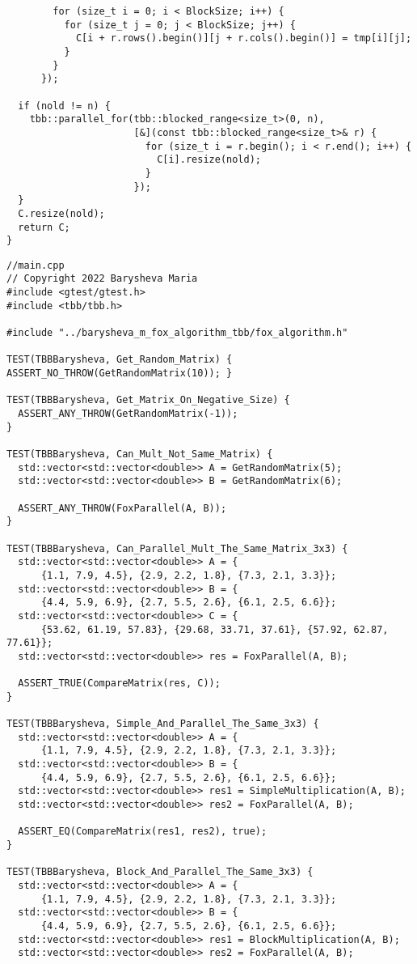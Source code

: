 \documentclass[12pt]{article}
\begin{document}
\begin{lstlisting}
        for (size_t i = 0; i < BlockSize; i++) {
          for (size_t j = 0; j < BlockSize; j++) {
            C[i + r.rows().begin()][j + r.cols().begin()] = tmp[i][j];
          }
        }
      });

  if (nold != n) {
    tbb::parallel_for(tbb::blocked_range<size_t>(0, n),
                      [&](const tbb::blocked_range<size_t>& r) {
                        for (size_t i = r.begin(); i < r.end(); i++) {
                          C[i].resize(nold);
                        }
                      });
  }
  C.resize(nold);
  return C;
}
\end{lstlisting}
\begin{lstlisting}
//main.cpp
// Copyright 2022 Barysheva Maria
#include <gtest/gtest.h>
#include <tbb/tbb.h>

#include "../barysheva_m_fox_algorithm_tbb/fox_algorithm.h"

TEST(TBBBarysheva, Get_Random_Matrix) { ASSERT_NO_THROW(GetRandomMatrix(10)); }

TEST(TBBBarysheva, Get_Matrix_On_Negative_Size) {
  ASSERT_ANY_THROW(GetRandomMatrix(-1));
}

TEST(TBBBarysheva, Can_Mult_Not_Same_Matrix) {
  std::vector<std::vector<double>> A = GetRandomMatrix(5);
  std::vector<std::vector<double>> B = GetRandomMatrix(6);

  ASSERT_ANY_THROW(FoxParallel(A, B));
}

TEST(TBBBarysheva, Can_Parallel_Mult_The_Same_Matrix_3x3) {
  std::vector<std::vector<double>> A = {
      {1.1, 7.9, 4.5}, {2.9, 2.2, 1.8}, {7.3, 2.1, 3.3}};
  std::vector<std::vector<double>> B = {
      {4.4, 5.9, 6.9}, {2.7, 5.5, 2.6}, {6.1, 2.5, 6.6}};
  std::vector<std::vector<double>> C = {
      {53.62, 61.19, 57.83}, {29.68, 33.71, 37.61}, {57.92, 62.87, 77.61}};
  std::vector<std::vector<double>> res = FoxParallel(A, B);

  ASSERT_TRUE(CompareMatrix(res, C));
}

TEST(TBBBarysheva, Simple_And_Parallel_The_Same_3x3) {
  std::vector<std::vector<double>> A = {
      {1.1, 7.9, 4.5}, {2.9, 2.2, 1.8}, {7.3, 2.1, 3.3}};
  std::vector<std::vector<double>> B = {
      {4.4, 5.9, 6.9}, {2.7, 5.5, 2.6}, {6.1, 2.5, 6.6}};
  std::vector<std::vector<double>> res1 = SimpleMultiplication(A, B);
  std::vector<std::vector<double>> res2 = FoxParallel(A, B);

  ASSERT_EQ(CompareMatrix(res1, res2), true);
}

TEST(TBBBarysheva, Block_And_Parallel_The_Same_3x3) {
  std::vector<std::vector<double>> A = {
      {1.1, 7.9, 4.5}, {2.9, 2.2, 1.8}, {7.3, 2.1, 3.3}};
  std::vector<std::vector<double>> B = {
      {4.4, 5.9, 6.9}, {2.7, 5.5, 2.6}, {6.1, 2.5, 6.6}};
  std::vector<std::vector<double>> res1 = BlockMultiplication(A, B);
  std::vector<std::vector<double>> res2 = FoxParallel(A, B);


\end{lstlisting}
\end{document}
